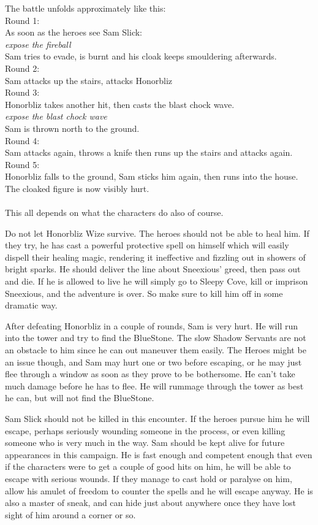 \documentclass[11pt, twoside, titlepage, a4paper]{report}
\begin{document}
The battle unfolds approximately like this: \\
Round 1: \\
As soon as the heroes see Sam Slick: \\
\emph{expose the fireball} \\
Sam tries to evade, is burnt and his cloak keeps smouldering afterwards. \\
Round 2: \\
Sam attacks up the stairs, attacks Honorbliz \\
Round 3: \\
Honorbliz takes another hit, then casts the blast chock wave. \\
\emph{expose the blast chock wave} \\
Sam is thrown north to the ground. \\
Round 4:  \\
Sam attacks again, throws a knife then runs up the stairs and attacks again. \\
Round 5: \\
Honorbliz falls to the ground, Sam sticks him again, then runs into the house. The cloaked figure is now visibly hurt. \\
\\
This all depends on what the characters do also of course.

Do not let Honorbliz Wize survive. The heroes should not be able to heal him. If they try, he has cast a powerful protective spell on himself which will easily dispell their healing magic, rendering it ineffective and fizzling out in showers of bright sparks. He should deliver the line about Sneexious' greed, then pass out and die.
If he is allowed to live he will simply go to Sleepy Cove, kill or imprison Sneexious, and the adventure is over. So make sure to kill him off in some dramatic way.

After defeating Honorbliz in a couple of rounds, Sam is very hurt. He will run into the tower and try to find the BlueStone. The slow Shadow Servants are not an obstacle to him since he can out maneuver them easily. The Heroes might be an issue though, and Sam may hurt one or two before escaping, or he may just flee through a window as soon as they prove to be bothersome. He can't take much damage before he has to flee. He will rummage through the tower as best he can, but will not find the BlueStone.

Sam Slick should not be killed in this encounter. If the heroes pursue him he will escape, perhaps seriously wounding someone in the process, or even killing someone who is very much in the way. Sam should be kept alive for future appearances in this campaign. He is fast enough and competent enough that even if the characters were to get a couple of good hits on him, he will be able to escape with serious wounds. If they manage to cast hold or paralyse on him, allow his amulet of freedom to counter the spells and he will escape anyway. He is also a master of sneak, and can hide just about anywhere once they have lost sight of him around a corner or so.
\end{document}
